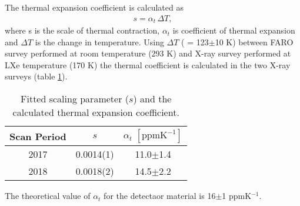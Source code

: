 The thermal expansion coefficient is calculated as
\begin{align}
 s= \alpha_t \, \Delta T,
\end{align}
where s is the scale of thermal contraction, $\alpha_t$ is coefficient
of thermal expansion and $\Delta T$ is the change in temperature. 
Using $\Delta T$ ( = 123$\pm$10 K) 
between FARO survey performed at room temperature
(293 K) and X-ray survey performed at LXe temperature (170 K)
the thermal coefficient is calculated in the
two X-ray surveys (table \ref{tab:thermalcoefficient}).
\begin{table}[h]
\centering
\begin{tabular}{ccc}
Scan Period & $s$ & $\alpha_t \,\, [\mathrm{ppm K}^{-1}]$\\
\hline
2017 & 0.0014(1) & 11.0$\pm$1.4 \\
2018 & 0.0018(2) & 14.5$\pm$2.2 
\end{tabular}
\caption{Fitted scaling parameter ($s$) and the calculated thermal 
expansion coefficient.}
\label{tab:thermalcoefficient}
\end{table}
The theoretical value of $\alpha_t$ for the
detectaor material is 16$\pm$1 ppmK$^{-1}$.


